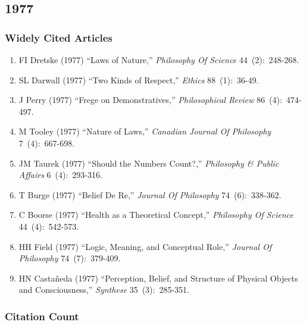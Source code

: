 \documentclass[
  10pt,
  letterpaper,
  DIV=11,
  numbers=noendperiod,
  twoside]{scrartcl}
\providecommand{\tightlist}{%
  \setlength{\itemsep}{0pt}\setlength{\parskip}{0pt}}\usepackage{longtable,booktabs,array}
\begin{document}
\newpage

\subsection{1977}\label{sec-s1977}

\subsubsection*{Widely Cited Articles}\label{widely-cited-articles-20}

\begin{enumerate}
\def\labelenumi{\arabic{enumi}.}
\tightlist
\item
  FI Dretske (1977) ``Laws of Nature,'' \emph{Philosophy Of Science}
  44~(2):~248-268.
\item
  SL Darwall (1977) ``Two Kinds of Respect,'' \emph{Ethics}
  88~(1):~36-49.
\item
  J Perry (1977) ``Frege on Demonstratives,'' \emph{Philosophical
  Review} 86~(4):~474-497.
\item
  M Tooley (1977) ``Nature of Laws,'' \emph{Canadian Journal Of
  Philosophy} 7~(4):~667-698.
\item
  JM Taurek (1977) ``Should the Numbers Count?,'' \emph{Philosophy \&
  Public Affairs} 6~(4):~293-316.
\item
  T Burge (1977) ``Belief De Re,'' \emph{Journal Of Philosophy}
  74~(6):~338-362.
\item
  C Boorse (1977) ``Health as a Theoretical Concept,'' \emph{Philosophy
  Of Science} 44~(4):~542-573.
\item
  HH Field (1977) ``Logic, Meaning, and Conceptual Role,'' \emph{Journal
  Of Philosophy} 74~(7):~379-409.
\item
  HN Castañeda (1977) ``Perception, Belief, and Structure of Physical
  Objects and Consciousness,'' \emph{Synthese} 35~(3):~285-351.
\end{enumerate}

\subsubsection*{Citation Count}\label{sec-count-1977}
\end{document}
